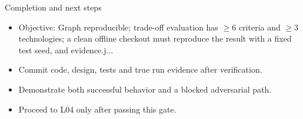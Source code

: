 \documentclass[aspectratio=169,10pt]{beamer}
\begin{document}
\begin{frame}{Completion and next steps}
\small
\begin{itemize}
\item Objective: Graph reproducible; trade-off evaluation has $\geq$6 criteria and $\geq$3 technologies; a clean offline checkout must reproduce the result with a fixed test seed, and evidence.j...
\item Commit code, design, tests and true run evidence after verification.
\item Demonstrate both successful behavior and a blocked adversarial path.
\item Proceed to L04 only after passing this gate.
\end{itemize}

\end{frame}
\end{document}

